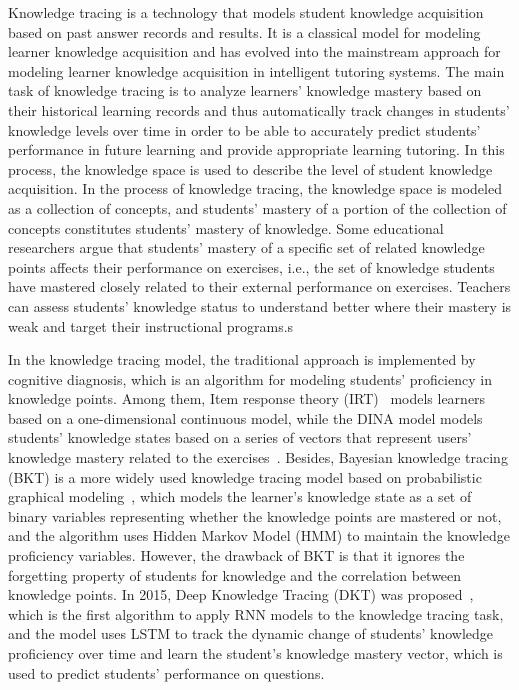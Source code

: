 Knowledge tracing is a technology that models student knowledge acquisition based on past answer records and results. It is a classical model for modeling learner knowledge acquisition and has evolved into the mainstream approach for modeling learner knowledge acquisition in intelligent tutoring systems. The main task of knowledge tracing is to analyze learners' knowledge mastery based on their historical learning records and thus automatically track changes in students' knowledge levels over time in order to be able to accurately predict students' performance in future learning and provide appropriate learning tutoring. In this process, the knowledge space is used to describe the level of student knowledge acquisition. In the process of knowledge tracing, the knowledge space is modeled as a collection of concepts, and students' mastery of a portion of the collection of concepts constitutes students' mastery of knowledge. Some educational researchers argue that students' mastery of a specific set of related knowledge points affects their performance on exercises, i.e., the set of knowledge students have mastered closely related to their external performance on exercises. Teachers can assess students' knowledge status to understand better where their mastery is weak and target their instructional programs.s

In the knowledge tracing model, the traditional approach is implemented by cognitive diagnosis, which is an algorithm for modeling students' proficiency in knowledge points. Among them, Item response theory (IRT)~\cite{pliakos_integrating_2019} models learners based on a one-dimensional continuous model, while the DINA model models students' knowledge states based on a series of vectors that represent users' knowledge mastery related to the exercises~\cite{huang2020utilizing}. Besides, Bayesian knowledge tracing (BKT) is a more widely used knowledge tracing model based on probabilistic graphical modeling~\cite{yudelson2013individualized}, which models the learner's knowledge state as a set of binary variables representing whether the knowledge points are mastered or not, and the algorithm uses Hidden Markov Model (HMM) to maintain the knowledge proficiency variables. However, the drawback of BKT is that it ignores the forgetting property of students for knowledge and the correlation between knowledge points. In 2015, Deep Knowledge Tracing (DKT) was proposed~\cite{piech2015deep}, which is the first algorithm to apply RNN models to the knowledge tracing task, and the model uses LSTM to track the dynamic change of students' knowledge proficiency over time and learn the student's knowledge mastery vector, which is used to predict students' performance on questions.

